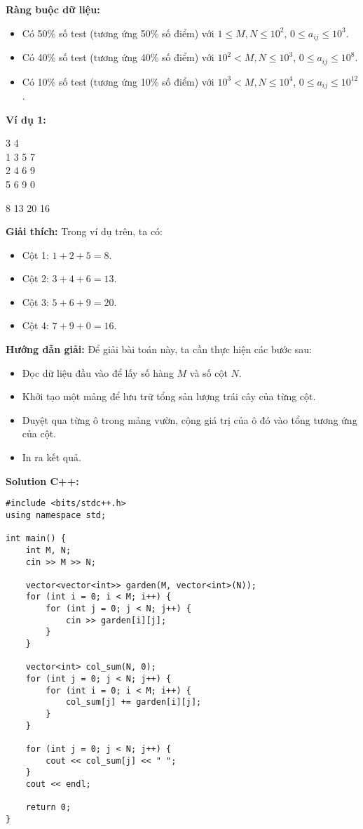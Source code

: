 \documentclass[12pt]{scrartcl}  %
\begin{document}
\textbf{Ràng buộc dữ liệu:}
\begin{itemize}
    \item Có 50\% số test (tương ứng 50\% số điểm) với $1 \leq M, N \leq 10^2$, $0 \leq a_{ij} \leq 10^3$.
    \item Có 40\% số test (tương ứng 40\% số điểm) với $10^2 < M, N \leq 10^3$, $0 \leq a_{ij} \leq 10^8$.
    \item Có 10\% số test (tương ứng 10\% số điểm) với $10^3 < M, N \leq 10^4$, $0 \leq a_{ij} \leq 10^{12}$.
\end{itemize}

\textbf{Ví dụ 1:}
\begin{tcolorbox}[colback=gray!5!white, colframe=blue!50!black, title=Input]
3 4\\
1 3 5 7\\
2 4 6 9\\
5 6 9 0
\end{tcolorbox}
\begin{tcolorbox}[colback=gray!5!white, colframe=green!50!black, title=Output]
8 13 20 16
\end{tcolorbox}

\textbf{Giải thích:}
Trong ví dụ trên, ta có:
\begin{itemize}
    \item Cột 1: $1 + 2 + 5 = 8$.
    \item Cột 2: $3 + 4 + 6 = 13$.
    \item Cột 3: $5 + 6 + 9 = 20$.
    \item Cột 4: $7 + 9 + 0 = 16$. 
\end{itemize}

\textbf{Hướng dẫn giải:}
Để giải bài toán này, ta cần thực hiện các bước sau:
\begin{itemize}
    \item Đọc dữ liệu đầu vào để lấy số hàng $M$ và số cột $N$.
    \item Khởi tạo một mảng để lưu trữ tổng sản lượng trái cây của từng cột.
    \item Duyệt qua từng ô trong mảng vườn, cộng giá trị của ô đó vào tổng tương ứng của cột.
    \item In ra kết quả.
\end{itemize}
\textbf{Solution C++:}
\begin{lstlisting}
#include <bits/stdc++.h>
using namespace std;

int main() {
    int M, N;
    cin >> M >> N;

    vector<vector<int>> garden(M, vector<int>(N));
    for (int i = 0; i < M; i++) {
        for (int j = 0; j < N; j++) {
            cin >> garden[i][j];
        }
    }

    vector<int> col_sum(N, 0);
    for (int j = 0; j < N; j++) {
        for (int i = 0; i < M; i++) {
            col_sum[j] += garden[i][j];
        }
    }

    for (int j = 0; j < N; j++) {
        cout << col_sum[j] << " ";
    }
    cout << endl;

    return 0;
}
\end{lstlisting}
\end{document}
